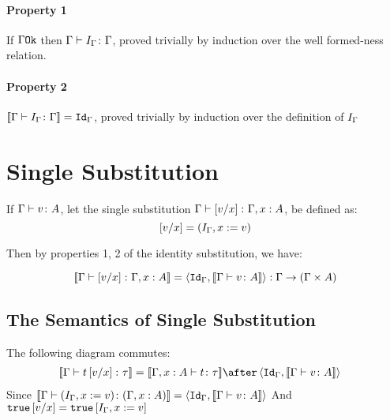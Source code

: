 {    \paragraph{Property 1}
    If $\ok{\G}$ then $\typerelation{\G}{I_{\G}}{\G}$, proved trivially by induction over the well formed-ness relation.

    \paragraph{Property 2}
    $\deno{\typerelation{\G}{I_{\G}}{\G}} = \idg$, proved trivially by induction over the definition of $I_{\G}$
    \section{Single Substitution}

    If $\typerelation{\G}{v}{A}$, let the single substitution $\typerelation{\G}{\ssub{x}{v}}{\gax}$, be defined as:
    \begin{equation}
        \ssub{x}{v} = (I_{\G}, x\setto v)
    \end{equation}

    Then by properties 1, 2 of the identity substitution, we have:

    \begin{equation}
        \deno{\gtyperelation{\ssub{x}{v}}{\gax}} = \pr{\idg}{\deno{\gtyperelation{v}{A}}}: \G\rightarrow(\G\times A)
    \end{equation}
    \subsection{The Semantics of Single Substitution}

    The following diagram commutes:
    \begin{align}
        \deno{\gtyperelation{t\ssub{x}{v}}{\tau}} &= \deno{\typerelation{\gax}{t}{\tau}}\after\pr{\idg}{\deno{\gtyperelation{v}{A}}}
    \end{align}
    Since $\deno{\gtyperelation{(I_{\G}, x\setto v)}{(\gax)}} = \pr{\idg}{\deno{\gtyperelation{v}{A}}}$
    And $\t\ssub{x}{v} = \t\sub{I_{\G}, x\setto{v}}$
    }


\ifdefined\NoDocument
\else
\documentclass{report}


    \Substitution

\fi